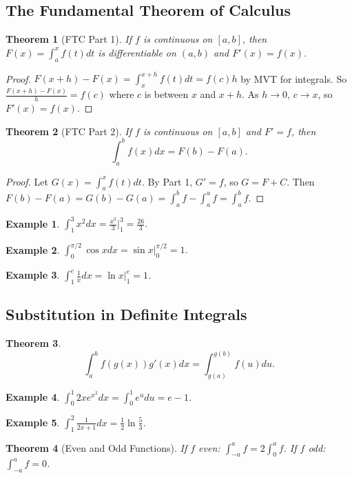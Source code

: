 \documentclass[11pt,a4paper]{article}
\newtheorem{example}{Example}
\newtheorem{theorem}{Theorem}
\begin{document}
\subsection{The Fundamental Theorem of Calculus}
\begin{theorem}[FTC Part 1]
If $f$ is continuous on $[a,b]$, then $F(x) = \int_a^x f(t) dt$ is differentiable on $(a,b)$ and $F'(x) = f(x)$.
\end{theorem}
\begin{proof}
$F(x+h) - F(x) = \int_x^{x+h} f(t) dt = f(c)h$ by MVT for integrals. So $\frac{F(x+h)-F(x)}{h} = f(c)$ where $c$ is between $x$ and $x+h$. As $h \to 0$, $c \to x$, so $F'(x) = f(x)$.
\end{proof}
\begin{theorem}[FTC Part 2]
If $f$ is continuous on $[a,b]$ and $F' = f$, then
\[
\int_a^b f(x) dx = F(b) - F(a).
\]
\end{theorem}
\begin{proof}
Let $G(x) = \int_a^x f(t)dt$. By Part 1, $G' = f$, so $G = F + C$. Then $F(b) - F(a) = G(b) - G(a) = \int_a^b f - \int_a^a f = \int_a^b f$.
\end{proof}
\begin{example}
$\int_1^3 x^2 dx = \frac{x^3}{3}\Big|_1^3 = \frac{26}{3}$.
\end{example}
\begin{example}
$\int_0^{\pi/2} \cos x dx = \sin x \Big|_0^{\pi/2} = 1$.
\end{example}
\begin{example}
$\int_1^e \frac{1}{x} dx = \ln x \Big|_1^e = 1$.
\end{example}
\subsection{Substitution in Definite Integrals}
\begin{theorem}
\[
\int_a^b f(g(x)) g'(x) dx = \int_{g(a)}^{g(b)} f(u) du.
\]
\end{theorem}
\begin{example}
$\int_0^1 2x e^{x^2} dx = \int_0^1 e^u du = e - 1$.
\end{example}
\begin{example}
$\int_1^2 \frac{1}{2x+1} dx = \frac{1}{2}\ln\frac{5}{3}$.
\end{example}
\begin{theorem}[Even and Odd Functions]
If $f$ even: $\int_{-a}^a f = 2\int_0^a f$. If $f$ odd: $\int_{-a}^a f = 0$.
\end{theorem}
\end{document}
